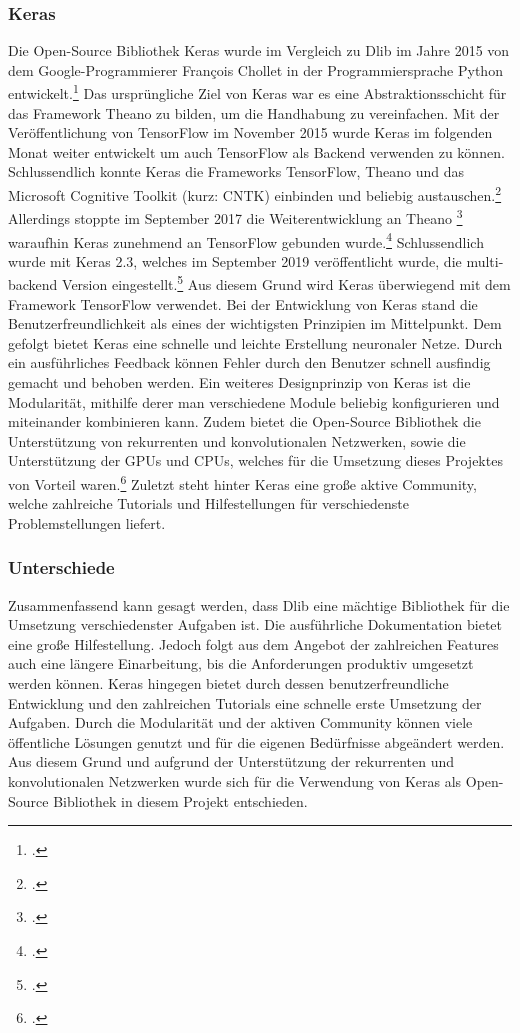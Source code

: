 \documentclass[12pt, a4paper]{report}
\begin{document}
\subsubsection{Keras}
Die Open-Source Bibliothek Keras wurde im Vergleich zu Dlib im Jahre 2015 von dem Google-Programmierer François Chollet in der Programmiersprache Python entwickelt.\footcite[Vgl.]{Keras}
Das ursprüngliche Ziel von Keras war es eine Abstraktionsschicht für das Framework Theano zu bilden, um die Handhabung zu vereinfachen. Mit der Veröffentlichung von TensorFlow im November 2015 wurde Keras im folgenden Monat weiter entwickelt um auch TensorFlow als Backend verwenden zu können. Schlussendlich konnte Keras die Frameworks TensorFlow, Theano und das Microsoft Cognitive Toolkit (kurz: CNTK) einbinden und beliebig austauschen.\footcite[Vgl.]{Keras3} Allerdings stoppte im September 2017 die Weiterentwicklung an Theano
\footcite[Vgl.]{Theano}
 waraufhin Keras zunehmend an TensorFlow gebunden wurde.\footcite[Vgl.]{Keras4} Schlussendlich wurde mit Keras 2.3, welches im September 2019 veröffentlicht wurde, die multi-backend Version eingestellt.\footcite[Vgl.]{Keras5} Aus diesem Grund wird Keras überwiegend mit dem Framework TensorFlow verwendet.
\newline
Bei der Entwicklung von Keras stand die Benutzerfreundlichkeit als eines der wichtigsten Prinzipien im Mittelpunkt. Dem gefolgt bietet Keras eine schnelle und leichte Erstellung neuronaler Netze. Durch ein ausführliches Feedback können Fehler durch den Benutzer schnell ausfindig gemacht und behoben werden. Ein weiteres Designprinzip von Keras ist die Modularität, mithilfe derer man verschiedene Module beliebig konfigurieren und miteinander kombinieren kann. Zudem bietet die Open-Source Bibliothek die Unterstützung von rekurrenten und konvolutionalen Netzwerken, sowie die Unterstützung der GPUs und CPUs, welches für die Umsetzung dieses Projektes von Vorteil waren.\footcite[Vgl.]{Keras2}
Zuletzt steht hinter Keras eine große aktive Community, welche zahlreiche Tutorials und Hilfestellungen für verschiedenste Problemstellungen liefert.


\subsubsection{Unterschiede}

Zusammenfassend kann gesagt werden, dass Dlib eine mächtige Bibliothek für die Umsetzung verschiedenster Aufgaben ist. Die ausführliche Dokumentation bietet eine große Hilfestellung. Jedoch folgt aus dem Angebot der zahlreichen Features auch eine längere Einarbeitung, bis die Anforderungen produktiv umgesetzt werden können.\newline
Keras hingegen bietet durch dessen benutzerfreundliche Entwicklung und den zahlreichen Tutorials eine schnelle erste Umsetzung der Aufgaben. Durch die Modularität und der aktiven Community können viele öffentliche Lösungen genutzt und für die eigenen Bedürfnisse abgeändert werden. 
Aus diesem Grund und aufgrund der Unterstützung der rekurrenten und konvolutionalen Netzwerken wurde sich für die Verwendung von Keras als Open-Source Bibliothek in diesem Projekt entschieden.
\end{document}
